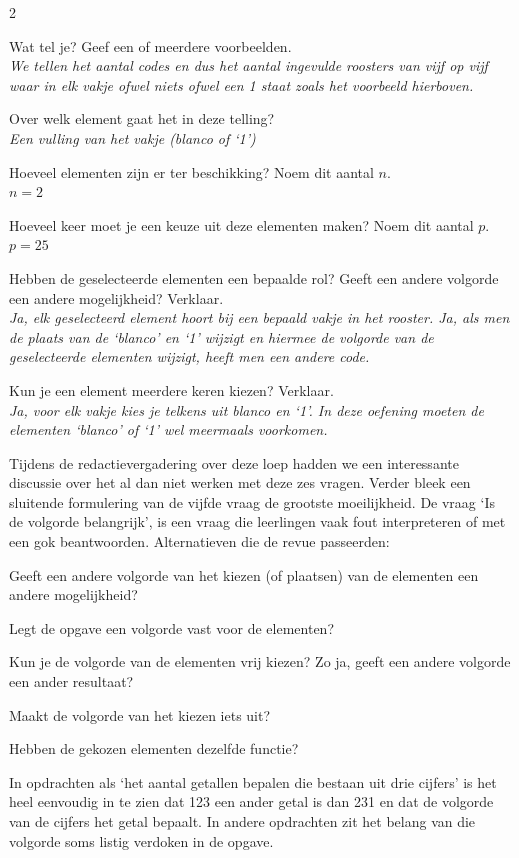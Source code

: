 \begin{multicols}{2}
\begin{nummering}

\item Wat tel je? Geef een of meerdere voorbeelden.\\
\emph{We tellen het aantal codes en dus het aantal ingevulde roosters van vijf op vijf waar in elk vakje ofwel niets ofwel een 1 staat zoals het voorbeeld hierboven.}
\item Over welk element gaat het in deze telling?\\
\emph{Een vulling van het vakje (blanco of ‘1’)}
\item Hoeveel elementen zijn er ter beschikking? Noem dit aantal $n$.\\
\emph{$n=2$}
\item Hoeveel keer moet je een keuze uit deze elementen maken? Noem dit aantal $p$.\\
\emph{$p=25$}
\item Hebben de geselecteerde elementen een bepaalde rol? Geeft een andere volgorde een andere mogelijkheid? Verklaar.\\
\emph{Ja, elk geselecteerd element hoort bij een bepaald vakje in het rooster.
Ja, als men de plaats van de ‘blanco’ en ‘1’ wijzigt en hiermee de volgorde van de geselecteerde elementen wijzigt, heeft men een andere code.}
\item Kun je een element meerdere keren kiezen? Verklaar.\\
\emph{Ja, voor elk vakje kies je telkens uit blanco en ‘1’. In deze oefening moeten de elementen ‘blanco’ of ‘1’ wel meermaals voorkomen.}
\end{nummering}

Tijdens de redactievergadering over deze loep hadden we een interessante discussie over het al dan niet werken met deze zes vragen. Verder bleek een sluitende formulering van de vijfde vraag de grootste moeilijkheid. De vraag ‘Is de volgorde belangrijk’, is een vraag die leerlingen vaak fout interpreteren of met een gok beantwoorden. Alternatieven die de revue passeerden: 
\begin{opsomming}
\item{Geeft een andere volgorde van het kiezen (of plaatsen) van de elementen een andere mogelijkheid?}
\item{Legt de opgave een volgorde vast voor de elementen?}
\item{Kun je de volgorde van de elementen vrij kiezen? Zo ja, geeft een andere volgorde een ander resultaat?}
\item{Maakt de volgorde van het kiezen iets uit?}
\item{Hebben de gekozen elementen dezelfde functie?}
\end{opsomming}
In opdrachten als ‘het aantal getallen bepalen die bestaan uit drie cijfers’ is het heel eenvoudig in te zien dat 123 een ander getal is dan 231 en dat de volgorde van de cijfers het getal bepaalt. In andere opdrachten zit het belang van die volgorde soms listig verdoken in de opgave.


\end{multicols}
